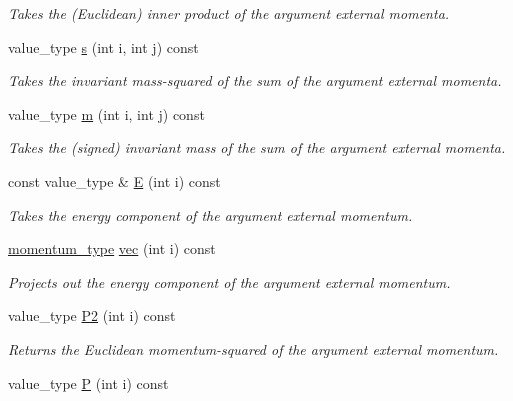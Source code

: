 \begin{DoxyCompactItemize}
\begin{DoxyCompactList}\small\item\em Takes the (Euclidean) inner product of the argument external momenta. \end{DoxyCompactList}\item 
value\-\_\-type \hyperlink{a00442_a6e5851bcdc5d86235f1348aea57b995a}{s} (int i, int j) const 
\begin{DoxyCompactList}\small\item\em Takes the invariant mass-\/squared of the sum of the argument external momenta. \end{DoxyCompactList}\item 
value\-\_\-type \hyperlink{a00442_ae7b1f38ebb163dcb4dc0b7f2928698a4}{m} (int i, int j) const 
\begin{DoxyCompactList}\small\item\em Takes the (signed) invariant mass of the sum of the argument external momenta. \end{DoxyCompactList}\item 
\hypertarget{a00442_a70eff6fadc1a889d712f5d95e73fb912}{const value\-\_\-type \& \hyperlink{a00442_a70eff6fadc1a889d712f5d95e73fb912}{E} (int i) const }\label{a00442_a70eff6fadc1a889d712f5d95e73fb912}

\begin{DoxyCompactList}\small\item\em Takes the energy component of the argument external momentum. \end{DoxyCompactList}\item 
\hypertarget{a00442_acee376677b0f549028eb3e8fb66f3e3c}{\hyperlink{a00559}{momentum\-\_\-type} \hyperlink{a00442_acee376677b0f549028eb3e8fb66f3e3c}{vec} (int i) const }\label{a00442_acee376677b0f549028eb3e8fb66f3e3c}

\begin{DoxyCompactList}\small\item\em Projects out the energy component of the argument external momentum. \end{DoxyCompactList}\item 
\hypertarget{a00442_a98c2381b3d5e714373d0351d2a20203d}{value\-\_\-type \hyperlink{a00442_a98c2381b3d5e714373d0351d2a20203d}{P2} (int i) const }\label{a00442_a98c2381b3d5e714373d0351d2a20203d}

\begin{DoxyCompactList}\small\item\em Returns the Euclidean momentum-\/squared of the argument external momentum. \end{DoxyCompactList}\item 
\hypertarget{a00442_aa564f96d3a4e3caf1fb7cd52dc69de76}{value\-\_\-type \hyperlink{a00442_aa564f96d3a4e3caf1fb7cd52dc69de76}{P} (int i) const }\label{a00442_aa564f96d3a4e3caf1fb7cd52dc69de76}


\end{DoxyCompactItemize}
